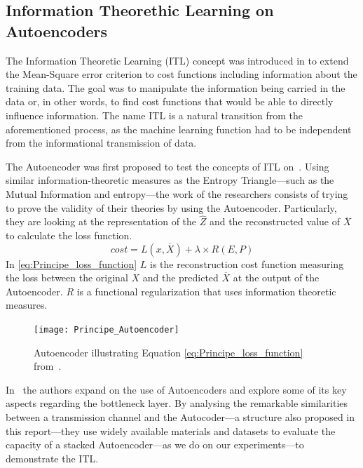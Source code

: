\subsection{Information Theorethic Learning on Autoencoders}

The Information Theoretic Learning (ITL) concept was introduced in \cite{Principe_2000} to extend the Mean-Square error criterion to cost functions including information about the training data. The goal was to manipulate the information being carried in the data or, in other words, to find cost functions that would be able to directly influence information. The name ITL is a natural transition from the aforementioned process, as the machine learning function had to be independent from the informational transmission of data. 


The Autoencoder was first proposed to test the concepts of ITL on~\cite{Santana_2016}. Using similar information-theoretic measures as the Entropy Triangle---such as the Mutual Information and entropy---the work of the researchers consists of trying to prove the validity of their theories by using the Autoencoder. Particularly, they are looking at the representation of the $\hat{Z}$ and the reconstructed value of $\overline{X}$ to calculate the loss function.
\begin{equation}
\label{eq:Principe_loss_function}
cost = L(x,\overline{X}) + \lambda \times R(E,P)
\end{equation}
In \eqref{eq:Principe_loss_function} $L$ is the reconstruction cost function measuring the loss between the original $X$ and the predicted $\overline{X}$ at the output of the Autoencoder. $R$ is a functional regularization that uses information theoretic measures.
\begin{figure}[H]
	\centering	
	\texttt{[image: Principe\_Autoencoder]}
	\caption{Autoencoder illustrating Equation \ref{eq:Principe_loss_function} from~\protect\cite{Santana_2016}.}
	\label{fig:figure_autoencoder2}
\end{figure} 

In~\cite{Yu_2019} the authors expand on the use of Autoencoders and explore some of its key aspects regarding the bottleneck layer. By analysing the remarkable similarities between a transmission channel and the Autocoder---a structure also proposed in this report---they use widely available materials and datasets to evaluate the capacity of a stacked Autoencoder---as we do on our experiments---to demonstrate the ITL. 


